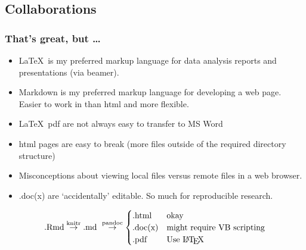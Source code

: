 \documentclass[t]{beamer}\usepackage[]{graphicx}\usepackage[]{color}
\begin{document}
\subsection{Collaborations}
\begin{frame}[fragile]
  \frametitle{That's great, but \ldots}

  \begin{itemize}
    \item \LaTeX\ is my preferred markup language for data analysis reports and
      presentations (via beamer).

    \item Markdown is my preferred markup language for developing a web page.
      Easier to work in than html and more flexible.

    \item \LaTeX\ pdf are not always easy to transfer to MS Word
    \item html pages are easy to break (more files outside of the required
      directory structure) 
    \item Misconceptions about viewing local files versus remote files in a web
      browser.
    \item .doc(x) are `accidentally' editable.  So much for reproducible
      research.
  \end{itemize}
  \[
  \text{.Rmd} \stackrel{\text{knitr}}{\rightarrow} 
  \text{.md } \stackrel{\text{pandoc}}{\rightarrow} 
  \begin{cases} 
        \text{.html} & \text{okay} \\
        \text{.doc(x)} & \text{might require VB scripting} \\
        \text{.pdf}  & \text{Use \LaTeX} 
      \end{cases}\]

\end{frame}

\end{document}
